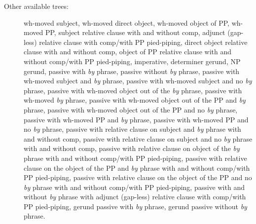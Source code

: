 \begin{description}
\item[Other available trees:] wh-moved subject, wh-moved direct object,
wh-moved object of PP, wh-moved PP, subject relative clause with and without comp, 
adjunct (gap-less) relative clause with comp/with PP pied-piping, direct object
relative clause with and without comp, object of PP relative clause with and 
without comp/with PP pied-piping, imperative, determiner
gerund, NP gerund, passive with {\it by} phrase, passive without {\it by}
phrase, passive with wh-moved subject and {\it by} phrase, passive with
wh-moved subject and no {\it by} phrase, passive with wh-moved object out
of the {\it by} phrase, passive with wh-moved {\it by} phrase, passive with
wh-moved object out of the PP and {\it by} phrase, passive with wh-moved
object out of the PP and no {\it by} phrase, passive with wh-moved PP and
{\it by} phrase, passive with wh-moved PP and no {\it by} phrase, passive
with relative clause on subject and {\it by} phrase with and without comp, 
passive with relative
clause on subject and no {\it by} phrase with and without comp, passive with relative clause on
object of the {\it by} phrase with and without comp/with PP pied-piping, 
passive with relative clause on the object
of the PP and {\it by} phrase with and without comp/with PP pied-piping, 
passive with relative clause on the object
of the PP and no {\it by} phrase with and without comp/with PP pied-piping, 
passive with and without {\it by} phrase with adjunct (gap-less) relative clause
with comp/with PP pied-piping,
gerund passive with {\it by} phrase,
gerund passive without {\it by} phrase.

\end{description}








